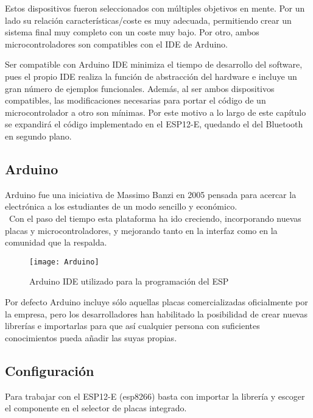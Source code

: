 Estos dispositivos fueron seleccionados con múltiples objetivos en mente. Por un lado su relación características/coste es muy adecuada, permitiendo crear un sistema final muy completo con un coste muy bajo. Por otro, ambos microcontroladores son compatibles con el IDE de Arduino.

Ser compatible con Arduino \acrshort{IDE} minimiza el tiempo de desarrollo del software, pues el propio IDE realiza la función de abstracción del hardware e incluye un gran número de ejemplos funcionales. Además, al ser ambos dispositivos compatibles, las modificaciones necesarias para portar el código de un microcontrolador a otro son mínimas. Por este motivo a lo largo de este capítulo se expandirá el código implementado en el ESP12-E, quedando el del Bluetooth en segundo plano.

\subsection{Arduino\label{sec:Software_Arduino}}

Arduino fue una iniciativa de Massimo Banzi en 2005 pensada para acercar la electrónica a los estudiantes de un modo sencillo y económico.\\\
Con el paso del tiempo esta plataforma ha ido creciendo, incorporando nuevas placas y microcontroladores, y mejorando tanto en la interfaz como en la comunidad que la respalda.

\begin{figure} [h]
    \centering
    \texttt{[image: Arduino]}
    \caption{Arduino IDE utilizado para la programación del ESP}
    \label{fig:Arduino}
\end{figure}

Por defecto Arduino incluye sólo aquellas placas comercializadas oficialmente por la empresa, pero los desarrolladores han habilitado la posibilidad de crear nuevas librerías e importarlas para que así cualquier persona con suficientes conocimientos pueda añadir las suyas propias.

\clearpage

\subsection{Configuración\label{sec:Software_Arduino_conf}}

Para trabajar con el ESP12-E (esp8266) basta con importar la librería y escoger el componente en el selector de placas integrado.

